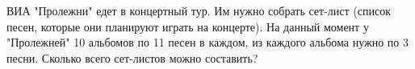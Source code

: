 \question
ВИА "Пролежни" едет в концертный тур. Им нужно собрать сет-лист (список песен, которые они планируют играть на концерте). На данный момент у "Пролежней" 10 альбомов по 11 песен в каждом, из каждого альбома нужно по 3 песни. Сколько всего сет-листов можно составить?
